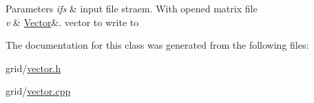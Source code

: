 \begin{DoxyParams}{Parameters}
{\em ifs} & input file straem. With opened matrix file \\
\hline
{\em v} & \hyperlink{classVector}{Vector}\&. vector to write to \\
\hline
\end{DoxyParams}


The documentation for this class was generated from the following files\+:\begin{DoxyCompactItemize}
\item 
grid/\hyperlink{vector_8h}{vector.\+h}\item 
grid/\hyperlink{vector_8cpp}{vector.\+cpp}\end{DoxyCompactItemize}
